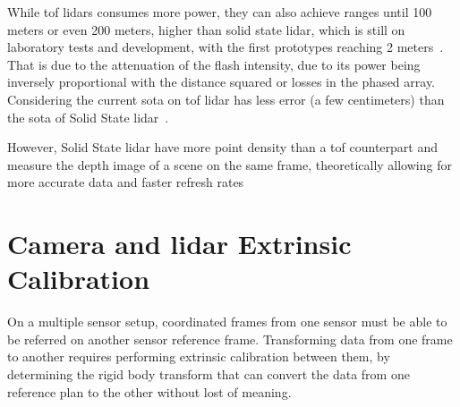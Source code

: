 While \ac{tof} \acp{lidar} consumes more power, they can also achieve ranges until 100 meters \cite{vlp16, Sullivan2016} or even 200 meters\cite{VelodyneHDL64, Sullivan2016}, higher than solid state \ac{lidar}, which is still on laboratory tests and development, with the first prototypes reaching 2 meters~\cite{Hecht2018}. That is due to the attenuation of the flash intensity, due to its power being inversely proportional with the distance squared or losses in the phased array. Considering the current \ac{sota} on \ac{tof} \ac{lidar} has less error (a few centimeters) than the \ac{sota} of Solid State \ac{lidar}~\cite{Hecht2018, Fersch2017a}.

However, Solid State \ac{lidar} have more point density than a \ac{tof} counterpart and measure the depth image of a scene on the same frame, theoretically allowing for more accurate data and faster refresh rates\cite{Sullivan2016, Hecht2018, Fersch2017a}






\section{Camera and \ac{lidar} Extrinsic Calibration}
\label{sec:sota:extrinsic_calibration}

On a multiple sensor setup, coordinated frames from one sensor must be able to be referred on another sensor reference frame. Transforming data from one frame to another requires performing extrinsic calibration between them, by determining the rigid body transform that can convert the data from one reference plan to the other without lost of meaning. 

